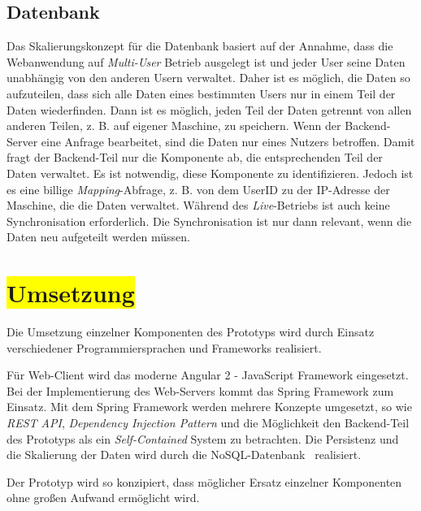 \subsection{Datenbank}

Das Skalierungskonzept für die Datenbank basiert auf der Annahme, dass die Webanwendung auf \textit{Multi-User} Betrieb ausgelegt ist und jeder User seine Daten unabhängig von den anderen Usern verwaltet. Daher ist es möglich, die Daten so aufzuteilen, dass sich alle Daten eines bestimmten Users nur in einem Teil der Daten wiederfinden. Dann ist es möglich, jeden Teil der Daten getrennt von allen anderen Teilen, z. B. auf eigener Maschine, zu speichern. Wenn der Backend-Server eine Anfrage bearbeitet, sind die Daten nur eines Nutzers betroffen. Damit fragt der Backend-Teil nur die Komponente ab, die entsprechenden Teil der Daten verwaltet. Es ist notwendig, diese Komponente zu identifizieren. Jedoch ist es eine billige \textit{Mapping}-Abfrage, z. B. von dem UserID zu der IP-Adresse der Maschine, die die Daten verwaltet. Während des \textit{Live}-Betriebs ist auch keine Synchronisation erforderlich. Die Synchronisation ist nur dann relevant, wenn die Daten neu aufgeteilt werden müssen.

\section{\colorbox{yellow}{Umsetzung}}

Die Umsetzung einzelner Komponenten des Prototyps wird durch Einsatz verschiedener Programmiersprachen und Frameworks realisiert.

Für Web-Client wird das moderne Angular 2 - JavaScript Framework eingesetzt. Bei der Implementierung des Web-Servers kommt das Spring Framework zum Einsatz. Mit dem Spring Framework werden mehrere Konzepte umgesetzt, so wie \textit{REST API}, \textit{Dependency Injection Pattern} und die Möglichkeit den Backend-Teil des Prototyps als ein \textit{Self-Contained} System zu betrachten. Die Persistenz und die Skalierung der Daten wird durch die NoSQL-Datenbank \mongo\ realisiert.

Der Prototyp wird so konzipiert, dass möglicher Ersatz einzelner Komponenten ohne großen Aufwand ermöglicht wird.

